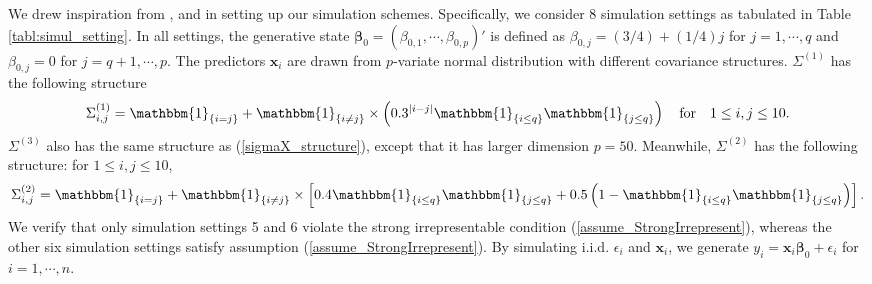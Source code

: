 \documentclass[ejs,authoryear,linksfromyear]{imsart}
\numberwithin{equation}{section}
\theoremstyle{plain}
\begin{document}
We drew inspiration from \citet{Das2019}, \citet{Liu&Yu} and \citet{WBB} in setting up our simulation schemes. Specifically, we consider 8 simulation settings as tabulated in Table \ref{tabl:simul_setting}. In all  settings, the generative state $\bm{\beta}_0 = (\beta_{0,1}, \cdots, \beta_{0,p})'$ is defined as $\beta_{0,j} = (3/4) + (1/4)j$ for $j = 1, \cdots, q$ and $\beta_{0,j} = 0$ for $j = q+1, \cdots, p$. The predictors $\bm{x}_i$ are drawn from $p$-variate normal distribution with different covariance structures. $\Sigma^{(1)}$ has the following structure
\begin{align} \label{sigmaX_structure}
\Sigma^{(1)}_{i,j} 
= \mathbbm{1}_{\{i = j\}} +
\mathbbm{1}_{\{i \neq j\}} \times 
\left(
	0.3^{|i-j|}
	\mathbbm{1}_{\{i \leq q\}}
	\mathbbm{1}_{\{j \leq q\}}
\right) 
\quad \text{for} \quad
1 \leq i,j \leq 10.
\end{align}   
$\Sigma^{(3)}$ also has the same structure as (\ref{sigmaX_structure}), except that it has larger dimension $p= 50$. Meanwhile, $\Sigma^{(2)}$ has the following structure: for $1 \leq i,j \leq 10$,  
$$
\Sigma^{(2)}_{i,j} 
= \mathbbm{1}_{\{i = j\}} +
\mathbbm{1}_{\{i \neq j\}} \times 
\left[
	0.4
	\mathbbm{1}_{\{i \leq q\}}
	\mathbbm{1}_{\{j \leq q\}}
	+ 0.5
	\left(
	1 - 
	\mathbbm{1}_{\{i \leq q\}}
	\mathbbm{1}_{\{j \leq q\}}
	\right)
\right].
$$
We verify that only simulation settings 5 and 6 violate the strong irrepresentable condition (\ref{assume_StrongIrrepresent}), whereas the other six simulation settings satisfy assumption (\ref{assume_StrongIrrepresent}). By simulating i.i.d. $\epsilon_i$ and $\bm{x}_i$, we generate $y_i = \bm{x}_i \bm{\beta}_0 + \epsilon_i$ for $i = 1, \cdots, n$. 
\end{document}
